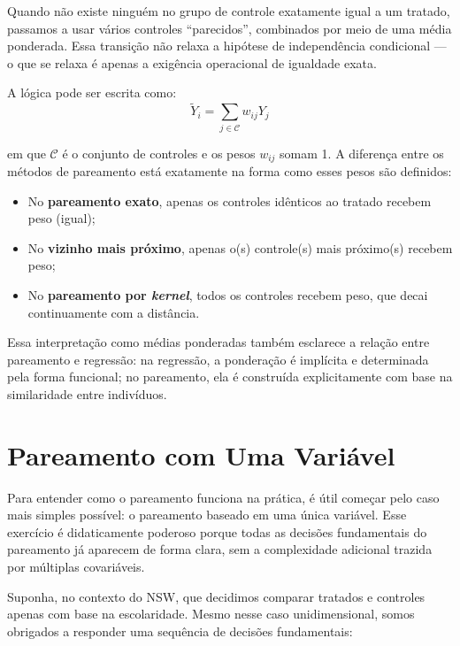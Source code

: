 \documentclass[12pt,a4paper]{article}
\begin{document}
Quando não existe ninguém no grupo de controle exatamente igual a um tratado, passamos a usar vários controles ``parecidos'', combinados por meio de uma média ponderada. Essa transição não relaxa a hipótese de independência condicional --- o que se relaxa é apenas a exigência operacional de igualdade exata.

A lógica pode ser escrita como:
$$\tilde{Y}_i = \sum_{j \in \mathcal{C}} w_{ij} Y_j$$

em que $\mathcal{C}$ é o conjunto de controles e os pesos $w_{ij}$ somam 1. A diferença entre os métodos de pareamento está exatamente na forma como esses pesos são definidos:

\begin{itemize}
  \item No \textbf{pareamento exato}, apenas os controles idênticos ao tratado recebem peso (igual);
  \item No \textbf{vizinho mais próximo}, apenas o(s) controle(s) mais próximo(s) recebem peso;
  \item No \textbf{pareamento por \textit{kernel}}, todos os controles recebem peso, que decai continuamente com a distância.
\end{itemize}

Essa interpretação como médias ponderadas também esclarece a relação entre pareamento e regressão: na regressão, a ponderação é implícita e determinada pela forma funcional; no pareamento, ela é construída explicitamente com base na similaridade entre indivíduos.

\newpage
\section{Pareamento com Uma Variável}\label{sec:univariado}

Para entender como o pareamento funciona na prática, é útil começar pelo caso mais simples possível: o pareamento baseado em uma única variável. Esse exercício é didaticamente poderoso porque todas as decisões fundamentais do pareamento já aparecem de forma clara, sem a complexidade adicional trazida por múltiplas covariáveis.

Suponha, no contexto do NSW, que decidimos comparar tratados e controles apenas com base na escolaridade. Mesmo nesse caso unidimensional, somos obrigados a responder uma sequência de decisões fundamentais:
\end{document}
